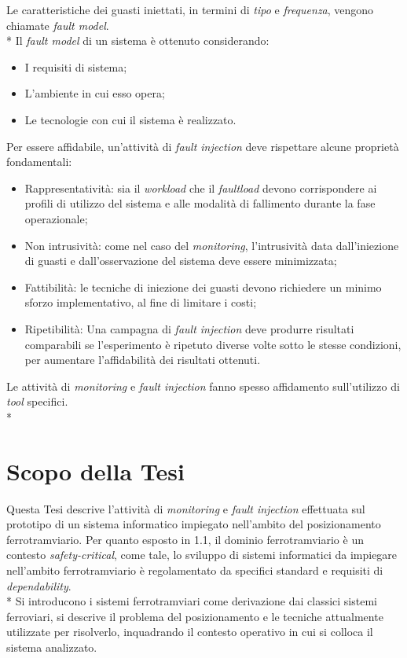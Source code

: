 Le caratteristiche dei guasti iniettati, in termini di \emph{tipo} e \emph{frequenza}, vengono chiamate \emph{fault model}.\\*
Il \emph{fault model} di un sistema \`e ottenuto considerando:
\begin{itemize}
	\item I requisiti di sistema;
	\item L'ambiente in cui esso opera;
	\item Le tecnologie con cui il sistema \`e realizzato.
\end{itemize}
Per essere affidabile, un'attivit\`a di \emph{fault injection} deve rispettare alcune propriet\`a fondamentali:
\begin{itemize}
	\item Rappresentativit\`a: sia il \emph{workload} che il \emph{faultload} devono corrispondere ai profili di utilizzo del sistema e alle modalit\`a di fallimento durante la fase operazionale;
	\item Non intrusivit\`a: come nel caso del \emph{monitoring}, l'intrusivit\`a data dall'iniezione di guasti e dall'osservazione del sistema deve essere minimizzata;
	\item Fattibilit\`a: le tecniche di iniezione dei guasti devono richiedere un minimo sforzo implementativo, al fine di limitare i costi;
	\item Ripetibilit\`a: Una campagna di \emph{fault injection} deve produrre risultati comparabili se l'esperimento \`e ripetuto diverse volte sotto le stesse condizioni, per aumentare l'affidabilit\`a dei risultati ottenuti.
\end{itemize}
Le attivit\`a di \emph{monitoring} e \emph{fault injection} fanno spesso affidamento sull'utilizzo di \emph{tool} specifici. \cite{monitoring}\\*
\section{Scopo della Tesi}
Questa Tesi descrive l'attivit\`a di \emph{monitoring} e \emph{fault injection} effettuata sul prototipo di un sistema informatico impiegato nell'ambito del posizionamento ferrotramviario. Per quanto esposto in 1.1, il dominio ferrotramviario \`e un contesto \emph{safety-critical}, come tale, lo sviluppo di sistemi informatici da impiegare nell'ambito ferrotramviario \`e regolamentato da specifici standard e requisiti di \emph{dependability}.\\*
Si introducono i sistemi ferrotramviari come derivazione dai classici sistemi ferroviari, si descrive il problema del posizionamento e le tecniche attualmente utilizzate per risolverlo, inquadrando il contesto operativo in cui si colloca il sistema analizzato.
